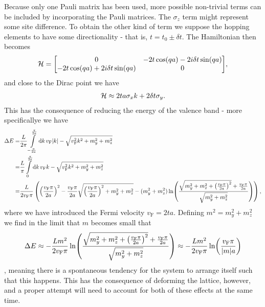 Because only one Pauli matrix has been used, more possible non-trivial terms can be included by incorporating the Pauli matrices. The $\sigma_{z}$ term might represent some site difference. To obtain the other kind of term we suppose the hopping elements to have some directionality - that is, $t = t_{0} \pm \delta t$. The Hamiltonian then becomes
\begin{align*}
	\ham = \mqty[
		0                                & -2t\cos(qa) - 2i\delta t\sin(qa) \\
		-2t\cos(qa) + 2i\delta t\sin(qa) & 0
	],
\end{align*}
and close to the Dirac point we have
\begin{align*}
	\mathcal{H} \approx 2ta\sigma_{x}k + 2\delta t\sigma_{y}.
\end{align*}
This has the consequence of reducing the energy of the valence band - more specificallye we have
\begin{align*}
	\Delta E =& \frac{L}{2\pi}\int\limits_{-\frac{\pi}{2a}}^{\frac{\pi}{2a}}\dd{k}v_{\text{F}}\abs{k} - \sqrt{v_{\text{F}}^{2}k^{2} + m_{y}^{2} + m_{z}^{2}} \\
	=& \frac{L}{\pi}\int\limits_{0}^{\frac{\pi}{2a}}\dd{k}v_{\text{F}}k - \sqrt{v_{\text{F}}^{2}k^{2} + m_{y}^{2} + m_{z}^{2}} \\
	=& \frac{L}{2v_{\text{F}}\pi}\left(\left(\frac{v_{\text{F}}\pi}{2a}\right)^{2} - \frac{v_{\text{F}}\pi}{2a}\sqrt{\left(\frac{v_{\text{F}}\pi}{2a}\right)^{2} + m_{y}^{2} + m_{z}^{2}} - (m_{y}^{2} + m_{z}^{2})\ln(\frac{\sqrt{m_{y}^{2} + m_{z}^{2} + \left(\frac{v_{\text{F}}\pi}{2a}\right)^{2}} + \frac{v_{\text{F}}\pi}{2a}}{\sqrt{m_{y}^{2} + m_{z}^{2}}})\right),
\end{align*}
where we have introduced the Fermi velocity $v_{\text{F}} = 2ta$. Defining $m^{2} = m_{y}^{2} + m_{z}^{2}$ we find in the limit that $m$ becomes small that
\begin{align*}
	\Delta E \approx -\frac{Lm^{2}}{2v_{\text{F}}\pi}\ln(\frac{\sqrt{m_{y}^{2} + m_{z}^{2} + \left(\frac{v_{\text{F}}\pi}{2a}\right)^{2}} + \frac{v_{\text{F}}\pi}{2a}}{\sqrt{m_{y}^{2} + m_{z}^{2}}}) \approx -\frac{Lm^{2}}{2v_{\text{F}}\pi}\ln(\frac{v_{\text{F}}\pi}{\abs{m}a})
\end{align*}
, meaning there is a spontaneous tendency for the system to arrange itself such that this happens. This has the consequence of deforming the lattice, however, and a proper attempt will need to account for both of these effects at the same time.

